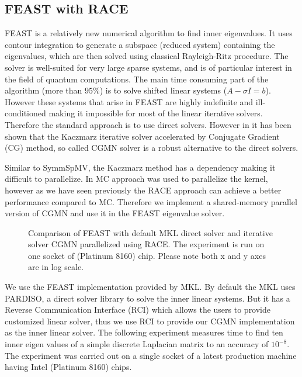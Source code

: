 \subsection{FEAST with RACE}
FEAST\cite{FEAST} is a relatively new numerical algorithm to find inner eigenvalues.
It uses contour integration to generate a subspace (reduced system) containing the eigenvalues,
which are then solved using classical Rayleigh-Ritz procedure. The solver is
well-suited for very large sparse systems, and is of particular interest in the field
of quantum computations.
 The main time consuming part of the algorithm (more than $95\%$) is to solve 
 shifted linear systems ($A- \sigma I = b$). However these systems
 that arise in FEAST are highly indefinite and ill-conditioned making it impossible
 for most of the linear iterative solvers. Therefore the standard approach
 is to use direct solvers. However in \cite{feast_mc} it has been shown
 that the Kaczmarz iterative solver accelerated by Conjugate Gradient (CG) method,
 so called CGMN solver is a robust alternative to the direct solvers. 
 
Similar to \acrshort{SymmSpMV}, the Kaczmarz method has a \DTWO dependency making
it difficult to parallelize. In \cite{feast_mc} \acrshort{MC} approach was used to
parallelize the kernel, however as we have seen previously the \acrshort{RACE}
approach can achieve a better performance compared to \acrshort{MC}. Therefore
we implement a shared-memory parallel version of CGMN and use it in the FEAST eigenvalue
solver.

  \setlength{\belowcaptionskip}{-15pt}
\begin{figure}[tb]
	\centering
	\scalebox{0.56}{}
	\caption{\label{fig:feast} Comparison of FEAST with default \acrshort{MKL} direct solver and 
		iterative solver CGMN parallelized using \acrshort{RACE}. The experiment is
		run on one socket of \SKX (Platinum 8160) chip. Please note both x and y axes
		are in log scale.}
\end{figure}
  \setlength{\belowcaptionskip}{0pt}
  
We use the FEAST implementation provided by \acrshort{MKL}. By default the MKL
uses PARDISO, a direct solver library to solve the inner linear systems. 
But it has a Reverse Communication Interface (RCI) which allows the users to provide 
customized linear solver, thus we use RCI to provide our CGMN implementation as the inner 
linear solver. The following experiment measures time to find ten inner eigen values 
of a simple discrete Laplacian matrix to an accuracy of $10^{-8}$. The experiment
was carried out on a single socket of a latest production machine having 
Intel \SKX (Platinum 8160) chips.

